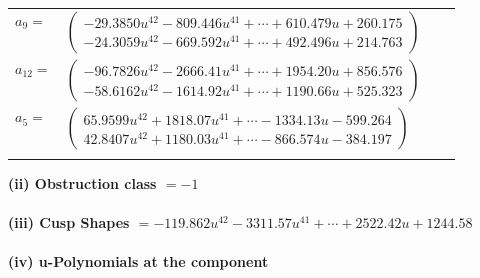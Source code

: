 \documentclass[1p]{elsarticle_modified}
\theoremstyle{definition}
\begin{document}
\begin{tabular}{m{7pt} m{180pt} m{7pt} m{180pt} }
\flushright $a_{9}=$&$\begin{pmatrix}-29.3850 u^{42}-809.446 u^{41}+\cdots+610.479 u+260.175\\-24.3059 u^{42}-669.592 u^{41}+\cdots+492.496 u+214.763\end{pmatrix}$ \\
\flushright $a_{12}=$&$\begin{pmatrix}-96.7826 u^{42}-2666.41 u^{41}+\cdots+1954.20 u+856.576\\-58.6162 u^{42}-1614.92 u^{41}+\cdots+1190.66 u+525.323\end{pmatrix}$ \\
\flushright $a_{5}=$&$\begin{pmatrix}65.9599 u^{42}+1818.07 u^{41}+\cdots-1334.13 u-599.264\\42.8407 u^{42}+1180.03 u^{41}+\cdots-866.574 u-384.197\end{pmatrix}$\\&\end{tabular}
\flushleft \textbf{(ii) Obstruction class $= -1$}\\~\\
\flushleft \textbf{(iii) Cusp Shapes $= -119.862 u^{42}-3311.57 u^{41}+\cdots+2522.42 u+1244.58$}\\~\\
\newpage\renewcommand{\arraystretch}{1}
\flushleft \textbf{(iv) u-Polynomials at the component}\newline \\
\end{document}
